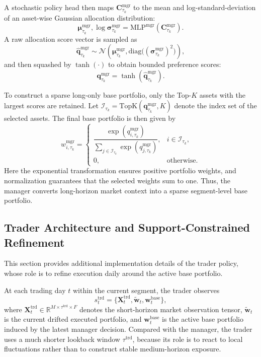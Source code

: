 \documentclass[letterpaper]{article} %
\begin{document}
A stochastic policy head then maps \(\mathbf{C}^{\mathrm{mgr}}_{\tau_k}\) to the mean and log-standard-deviation of an asset-wise Gaussian allocation distribution:
\[
\boldsymbol{\mu}^{\mathrm{mgr}}_{\tau_k},
\log \boldsymbol{\sigma}^{\mathrm{mgr}}_{\tau_k}
=
\mathrm{MLP}^{\mathrm{mgr}}\!\left(\mathbf{C}^{\mathrm{mgr}}_{\tau_k}\right).
\]
A raw allocation score vector is sampled as
\[
\hat{\mathbf{q}}^{\mathrm{mgr}}_{\tau_k}
\sim
\mathcal{N}\!\left(
\boldsymbol{\mu}^{\mathrm{mgr}}_{\tau_k},
\mathrm{diag}\bigl((\boldsymbol{\sigma}^{\mathrm{mgr}}_{\tau_k})^2\bigr)
\right),
\]
and then squashed by \(\tanh(\cdot)\) to obtain bounded preference scores:
\[
\mathbf{q}^{\mathrm{mgr}}_{\tau_k}
=
\tanh\!\left(\hat{\mathbf{q}}^{\mathrm{mgr}}_{\tau_k}\right).
\]

To construct a sparse long-only base portfolio, only the Top-\(K\) assets with the largest scores are retained. Let \(\mathcal{I}_{\tau_k}=\mathrm{TopK}(\mathbf{q}^{\mathrm{mgr}}_{\tau_k},K)\) denote the index set of the selected assets. The final base portfolio is then given by
\[
w_{i,\tau_k}^{\mathrm{mgr}}
=
\begin{cases}
\dfrac{\exp(q_{i,\tau_k}^{\mathrm{mgr}})}
{\sum_{j\in\mathcal{I}_{\tau_k}}
\exp(q_{j,\tau_k}^{\mathrm{mgr}})},
& i\in\mathcal{I}_{\tau_k},\\[10pt]
0, & \text{otherwise}.
\end{cases}
\]
Here the exponential transformation ensures positive portfolio weights, and normalization guarantees that the selected weights sum to one. Thus, the manager converts long-horizon market context into a sparse segment-level base portfolio.

\subsection{Trader Architecture and Support-Constrained Refinement}
\label{app:hier_trader}

This section provides additional implementation details of the trader policy, whose role is to refine execution daily around the active base portfolio.

At each trading day \(t\) within the current segment, the trader observes
\[
s_t^{\mathrm{trd}}
=
\bigl\{\mathbf{X}^{\mathrm{trd}}_t,\tilde{\mathbf{w}}_t,\mathbf{w}^{\mathrm{base}}_t\bigr\},
\]
where \(\mathbf{X}^{\mathrm{trd}}_t\in\mathbb{R}^{M\times \tau^{\mathrm{trd}}\times F}\) denotes the short-horizon market observation tensor, \(\tilde{\mathbf{w}}_t\) is the current drifted executed portfolio, and \(\mathbf{w}^{\mathrm{base}}_t\) is the active base portfolio induced by the latest manager decision. Compared with the manager, the trader uses a much shorter lookback window \(\tau^{\mathrm{trd}}\), because its role is to react to local fluctuations rather than to construct stable medium-horizon exposure.
\end{document}
